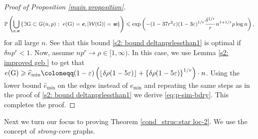 \documentclass[a4paper,11pt,english,reqno]{amsart}
\numberwithin{equation}{section}
\renewcommand{\leq}{\leqslant}
\renewcommand{\geq}{\geqslant}
\newcommand{\cbar}{\overline{C}}
\newcommand{\W}{\mathcal{W}}
\renewcommand{\P}{\mathbb{P}}
\newcommand{\G}{\mathbb{G}}
\newcommand{\tu}[1]{\textup{#1}}
\def\mathbi#1{\textbf{\em #1}}
\begin{document}
\begin{proof}[Proof of Proposition \ref{main proposition}]
			
			\begin{equation}\label{s2: bound deltanprlessthan1}
				\P\left(\bigcup_{\mathbi{e}, \mathbi{w}} \left\{\exists \tu{G}\subset \G(n,p):\ e(\tu{G})=\mathbi{e}, |\W(\tu{G})|=\mathbi{w}\right\}\right)\\[-1pt]
				\leq \exp\left(-(1-37r^{2}\varepsilon)(1-3\varepsilon)^{1/r}\frac{\delta^{1/r}}{r}n^{1+1/r}p\log n\right),
			\end{equation}
			for all large $n$. See that this bound \eqref{s2: bound deltanprlessthan1} is optimal if $\delta np^{r}<1$. Now, assume $np^{r}\rightarrow \rho\in[1,\infty)$. In this case, we use Lemma \ref{s2: improved geb } to get that 
			$
			e(\tu{G})\geq \widehat e_{\min} \coloneqq (1-\varepsilon)\left(\left\lfloor\delta\rho(1-5\varepsilon)\right\rfloor+\left\{\delta\rho(1-5\varepsilon)\right\}^{1/r}\right)\cdot n
			$. 
			Using the lower bound $\widehat{e}_{\min}$ on the edges instead of $e_{\min}$ and repeating the same steps as in the proof of \eqref{s2: bound deltanprlessthan1} we derive \eqref{eq:p-sim-bdry}. 
		This completes the proof.
	\end{proof}
	
	
	
	
	
	
	
	
	
	
	
	
	
	
	
	
	
	
	
	
	Next we turn our focus to proving Theorem \ref{cond_struc:star loc-2}. We use the concept of \textit{strong-core} graphs. 
	
\end{document}
